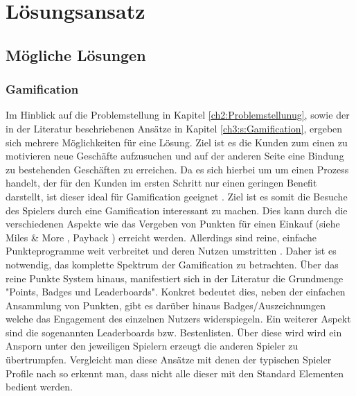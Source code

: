 \chapter{Lösungsansatz}
\label{sec:S4_Lösungsansatz}

\section{Mögliche Lösungen}

\subsection*{Gamification}

Im Hinblick auf die Problemstellung in Kapitel \ref{ch2:Problemstellunug}, sowie der in der Literatur beschriebenen Ansätze in Kapitel \ref{ch3:s:Gamification}, ergeben sich mehrere Möglichkeiten für eine Lösung. Ziel ist es die Kunden zum einen zu motivieren neue Geschäfte aufzusuchen und auf der anderen Seite eine Bindung zu bestehenden Geschäften zu erreichen. Da es sich hierbei um um einen Prozess handelt, der für den Kunden im ersten Schritt nur einen geringen Benefit darstellt, ist dieser ideal für Gamification geeignet \cite{Leigh.2012}. Ziel ist es somit die Besuche des Spielers durch eine Gamification interessant zu machen. Dies kann durch die verschiedenen Aspekte wie das Vergeben von Punkten für einen Einkauf (siehe Miles \& More \cite{Wagner.2005}, Payback \cite{Roesl.2005}) erreicht werden. Allerdings sind reine, einfache Punkteprogramme weit verbreitet und deren Nutzen umstritten \cite{Schmitt.2001}.
Daher ist es notwendig, das komplette Spektrum der Gamification zu betrachten.
Über das reine Punkte System hinaus, manifestiert sich in der Literatur die Grundmenge "Points, Badges und Leaderboards".
Konkret bedeutet dies, neben der einfachen Ansammlung von Punkten, gibt es darüber hinaus Badges/Auszeichnungen welche das Engagement des einzelnen Nutzers widerspiegeln. Ein weiterer Aspekt sind die sogenannten Leaderboards bzw. Bestenlisten. Über diese wird wird ein Ansporn unter den jeweiligen Spielern erzeugt die anderen Spieler zu übertrumpfen. Vergleicht man diese Ansätze mit denen der typischen Spieler Profile nach \citep{Bartle.2004} so erkennt man, dass nicht alle dieser mit den Standard Elementen bedient werden.

